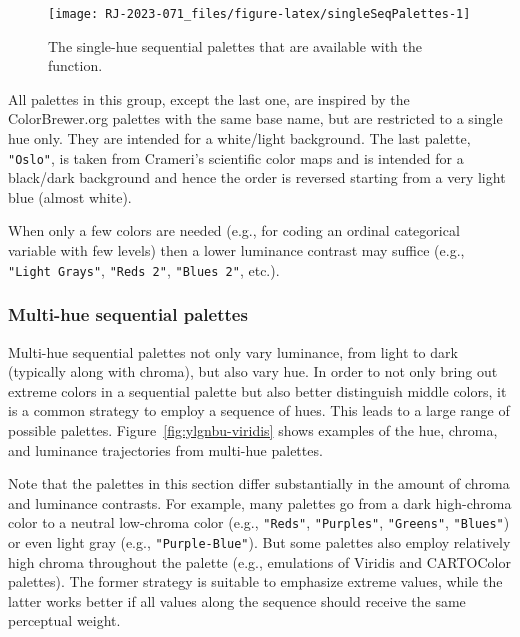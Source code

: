 \begin{figure}[ht!]

{\centering \texttt{[image: RJ-2023-071\_files/figure-latex/singleSeqPalettes-1]} 

}

\caption{The single-hue sequential palettes that are available with the  function.}\label{fig:singleSeqPalettes}
\end{figure}

All palettes in this group,
except the last one, are inspired by the ColorBrewer.org palettes with
the same base name, but are restricted to a
single hue only. They are intended for a white/light background. The
last palette, \texttt{"Oslo"}, is taken from Crameri's scientific color maps
and is intended for a black/dark background and hence the order
is reversed starting from a very light blue (almost white).

When only a few colors
are needed (e.g., for coding an ordinal categorical variable with few
levels) then a lower luminance contrast may suffice
(e.g., \texttt{"Light\ Grays"}, \texttt{"Reds\ 2"}, \texttt{"Blues\ 2"}, etc.).

\hypertarget{multi-hue-sequential-palettes}{%
\subsubsection{Multi-hue sequential palettes}\label{multi-hue-sequential-palettes}}

Multi-hue
sequential palettes not only vary luminance, from light to dark
(typically along with chroma), but also vary hue.
In order to not only bring out extreme colors in a sequential palette but also
better distinguish middle colors, it is a common strategy to employ a
sequence of hues. This leads to a large range of possible palettes.
Figure~\ref{fig:ylgnbu-viridis} shows examples of the
hue, chroma, and luminance trajectories from multi-hue palettes.

Note that the palettes in this section
differ substantially in the amount of chroma
and luminance contrasts. For example, many palettes go from a dark
high-chroma color to a neutral low-chroma color (e.g., \texttt{"Reds"},
\texttt{"Purples"}, \texttt{"Greens"}, \texttt{"Blues"}) or even light gray (e.g.,
\texttt{"Purple-Blue"}). But some palettes also employ relatively high chroma
throughout the palette (e.g., emulations of Viridis and CARTOColor palettes).
The former strategy is suitable to
emphasize extreme values,
while the latter works better if all values along the sequence should
receive the same perceptual weight.

